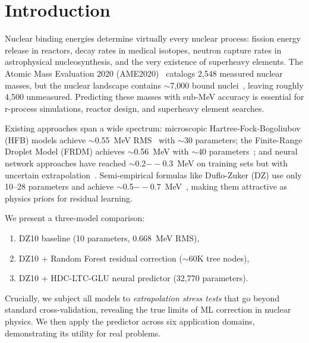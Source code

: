 \documentclass[twocolumn,letterpaper,10pt]{article}
\begin{document}
\maketitle

\section{Introduction}

Nuclear binding energies determine virtually every nuclear process: fission
energy release in reactors, decay rates in medical isotopes, neutron capture
rates in astrophysical nucleosynthesis, and the very existence of superheavy
elements. The Atomic Mass Evaluation 2020 (AME2020)~\cite{ame2020} catalogs
2,548 measured nuclear masses, but the nuclear landscape contains $\sim$7,000
bound nuclei~\cite{erler2012}, leaving roughly 4,500 unmeasured. Predicting
these masses with sub-MeV accuracy is essential for r-process simulations,
reactor design, and superheavy element searches.

Existing approaches span a wide spectrum: microscopic Hartree-Fock-Bogoliubov
(HFB) models achieve $\sim$0.55~MeV RMS~\cite{goriely2013} with $\sim$30
parameters; the Finite-Range Droplet Model (FRDM) achieves
$\sim$0.56~MeV with $\sim$40 parameters~\cite{moller2016}; and neural
network approaches have reached $\sim$0.2$--$0.3~MeV on training sets but
with uncertain extrapolation~\cite{niu2018}. Semi-empirical formulas like
Duflo-Zuker (DZ) use only 10--28 parameters and achieve
$\sim$0.5$--$0.7~MeV~\cite{duflo1995}, making them attractive as physics
priors for residual learning.

We present a three-model comparison:
\begin{enumerate}
\item DZ10 baseline (10 parameters, 0.668~MeV RMS),
\item DZ10 + Random Forest residual correction ($\sim$60K tree nodes),
\item DZ10 + HDC-LTC-GLU neural predictor (32,770 parameters).
\end{enumerate}
Crucially, we subject all models to \emph{extrapolation stress tests} that
go beyond standard cross-validation, revealing the true limits of ML
correction in nuclear physics. We then apply the predictor across six
application domains, demonstrating its utility for real problems.
\end{document}
